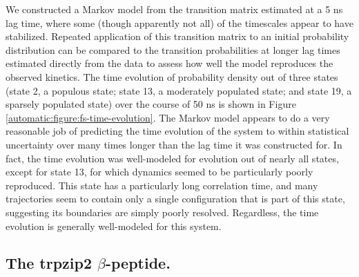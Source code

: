 We constructed a Markov model from the transition matrix estimated at a 5 ns lag time, where some (though apparently not all) of the timescales appear to have stabilized.
Repeated application of this transition matrix to an initial probability distribution can be compared to the transition probabilities at longer lag times estimated directly from the data to assess how well the model reproduces the observed kinetics.
The time evolution of probability density out of three states (state 2, a populous state; state 13, a moderately populated state; and state 19, a sparsely populated state) over the course of 50 ns is shown in Figure \ref{automatic:figure:fs-time-evolution}.
The Markov model appears to do a very reasonable job of predicting the time evolution of the system to within statistical uncertainty over many times longer than the lag time it was constructed for.
In fact, the time evolution was well-modeled for evolution out of nearly all states, except for state 13, for which dynamics seemed to be particularly poorly reproduced.
This state has a particularly long correlation time, and many trajectories seem to contain only a single configuration that is part of this state, suggesting its boundaries are simply poorly resolved.
Regardless, the time evolution is generally well-modeled for this system.




\subsection{The trpzip2 $\beta$-peptide.}
\label{automatic:applications:hairpin}

